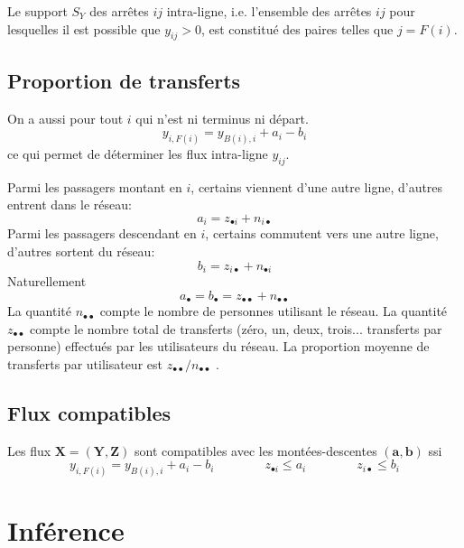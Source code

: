\documentclass{article}
\theoremstyle{plain}
\begin{document}
Le support $S_Y$ des arrêtes $ij$ intra-ligne,  i.e.  l'ensemble des arrêtes $ij$ pour lesquelles il est possible que $y_{ij}>0$, est constitué des paires telles que  $j=F(i)$. 

\subsection{Proportion de transferts}
On a aussi pour tout $i$ qui n'est ni terminus ni départ. 
\begin{equation}
\label{bilan1ligne}
y_{i,F(i)}=y_{B(i),i}+a_i-b_i
\end{equation}
ce qui permet de déterminer les flux intra-ligne $y_{ij}$. 


Parmi les passagers montant en $i$, certains viennent d'une autre ligne, d'autres entrent dans le réseau: 
\begin{equation}
\label{entrer}
a_i=z_{\bullet i}+n_{i\bullet}
\end{equation}
Parmi les passagers descendant en $i$, certains commutent vers une autre ligne, d'autres sortent du réseau: 
\begin{equation}
\label{sortir}
b_i=z_{i\bullet}+n_{\bullet i}
\end{equation}
Naturellement 
\begin{displaymath}
a_{\bullet}=b_{\bullet}=z_{\bullet\bullet}+n_{\bullet\bullet}
\end{displaymath}
La quantité $n_{\bullet\bullet}$ compte le nombre de personnes utilisant le réseau. La quantité $z_{\bullet\bullet}$ compte le nombre total de transferts (zéro, un, deux, trois...  transferts par personne) effectués par les utilisateurs du réseau. La proportion moyenne de transferts par utilisateur est $z_{\bullet\bullet}/n_{\bullet\bullet}$ . 

\subsection{Flux compatibles}
Les flux $\mathbf{X}=(\mathbf{Y},\mathbf{Z})$ sont compatibles avec les montées-descentes $(\mathbf{a},\mathbf{b})$ ssi
\begin{equation}
\label{compatibilite}
y_{i,F(i)}=y_{B(i),i}+a_i-b_i
\qquad\qquad 
z_{\bullet i}\le a_i 
\qquad\qquad 
z_{i\bullet}\le b_i
\end{equation}




\section{Inférence}
\end{document}
